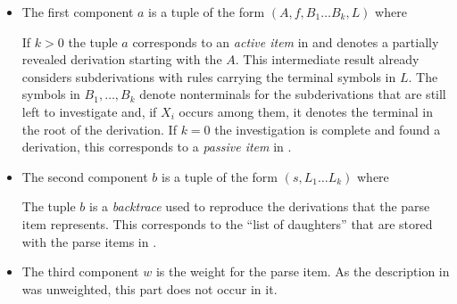 \documentclass[../document.tex]{subfiles}
\begin{document}
    \begin{itemize}
        \item The first component \(a\) is a tuple of the form \((A, f, B_1 \ldots B_k, L)\) where
            If \(k>0\) the tuple \(a\) corresponds to an \emph{active item} in  and denotes a partially revealed derivation starting with the  \(A\).
            This intermediate result already considers subderivations with rules carrying the terminal symbols in \(L\).
            The symbols in \(B_1, \ldots, B_k\) denote nonterminals for the subderivations that are still left to investigate and, if \(X_i\) occurs among them, it denotes the terminal in the root of the derivation.
            If \(k=0\) the investigation is complete and found a derivation, this corresponds to a \emph{passive item} in .
        \item The second component \(b\) is a tuple of the form \((s, L_1 \ldots L_k)\) where
            The tuple \(b\) is a \emph{backtrace} used to reproduce the derivations that the parse item represents.
            This corresponds to the ``list of daughters'' that are stored with the parse items in .
        \item
            The third component \(w\) is the weight for the parse item.
            As the description in  was unweighted, this part does not occur in it.
    \end{itemize}
    
\end{document}
